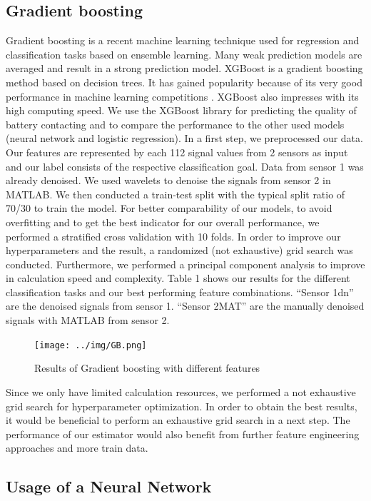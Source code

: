 \documentclass[12pt]{report}
\begin{document}
\subsection{Gradient boosting}
Gradient boosting is a recent machine learning technique used for regression and classification tasks based on ensemble learning. Many weak prediction models are averaged and result in a strong prediction model. XGBoost is a gradient boosting method based on decision trees. It has gained popularity because of its very good performance in machine learning competitions  . XGBoost also impresses with its high computing speed.
We use the XGBoost library for predicting the quality of battery contacting and to compare the performance to the other used models (neural network and logistic regression). In a first step, we preprocessed our data. Our features are represented by each 112 signal values from 2 sensors as input and our label consists of the respective classification goal. Data from sensor 1 was already denoised. We used wavelets to denoise the signals from sensor 2 in MATLAB. We then conducted a train-test split with the typical split ratio of 70/30 to train the model. For better comparability of our models, to avoid overfitting and to get the best indicator for our overall performance, we performed a stratified cross validation with 10 folds. In order to improve our hyperparameters and the result, a randomized (not exhaustive) grid search was conducted. Furthermore, we performed a principal component analysis to improve in calculation speed and complexity. Table 1 shows our results for the different classification tasks and our best performing feature combinations. “Sensor 1dn” are the denoised signals from sensor 1. “Sensor 2MAT” are the manually denoised signals with MATLAB from sensor 2.

\begin{figure}[H]
	\centering
	\texttt{[image: ../img/GB.png]}
	\caption{Results of Gradient boosting with different features
	}
	\label{fig:GB}
\end{figure}

Since we only have limited calculation resources, we performed a not exhaustive grid search for hyperparameter optimization. In order to obtain the best results, it would be beneficial to perform an exhaustive grid search in a next step. The performance of our estimator would also benefit from further feature engineering approaches and more train data. 

\subsection{Usage of a Neural Network}
\end{document}
